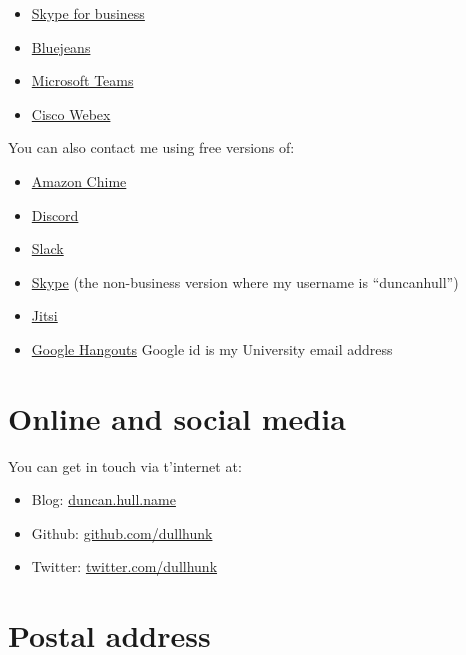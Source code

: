 \documentclass[
  12pt,
]{book}
\providecommand{\tightlist}{%
  \setlength{\itemsep}{0pt}\setlength{\parskip}{0pt}}
\begin{document}
\begin{itemize}
\tightlist
\item
  \href{https://en.wikipedia.org/wiki/Skype_for_Business}{Skype for business}
\item
  \href{https://en.wikipedia.org/wiki/BlueJeans}{Bluejeans}
\item
  \href{https://en.wikipedia.org/wiki/Microsoft_Teams}{Microsoft Teams}
\item
  \href{https://en.wikipedia.org/wiki/Cisco_Webex}{Cisco Webex}
\end{itemize}

You can also contact me using free versions of:

\begin{itemize}
\tightlist
\item
  \href{https://aws.amazon.com/chime/}{Amazon Chime}
\item
  \href{https://en.wikipedia.org/wiki/Discord_(software)}{Discord}
\item
  \href{https://en.wikipedia.org/wiki/Slack_(software)}{Slack}
\item
  \href{https://en.wikipedia.org/wiki/Skype}{Skype} (the non-business version where my username is ``duncanhull'')
\item
  \href{https://en.wikipedia.org/wiki/Jitsi}{Jitsi}
\item
  \href{https://en.wikipedia.org/wiki/Google_Hangouts}{Google Hangouts} Google id is my University email address
\end{itemize}

\hypertarget{online-and-social-media}{%
\section{Online and social media}\label{online-and-social-media}}

You can get in touch via t'internet at:

\begin{itemize}
\tightlist
\item
  Blog: \href{https://duncan.hull.name}{duncan.hull.name}
\item
  Github: \href{https://github.com/dullhunk}{github.com/dullhunk}
\item
  Twitter: \href{https://twitter.com/dullhunk}{twitter.com/dullhunk}
\end{itemize}

\hypertarget{postal-address}{%
\section{Postal address}\label{postal-address}}
\end{document}
